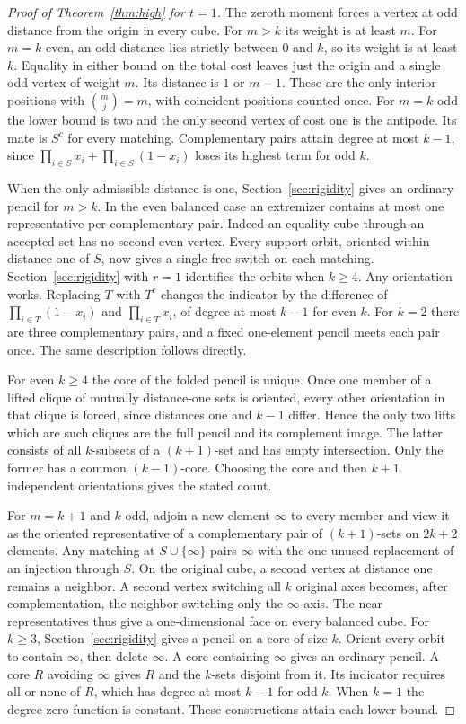\documentclass[11pt,letterpaper]{article}
\numberwithin{equation}{section}
\begin{document}
\begin{proof}[Proof of Theorem~\ref{thm:high} for $t=1$]

The zeroth moment forces a vertex at odd distance from the origin in every cube. For $m>k$ its
weight is at least $m$. For $m=k$ even, an odd distance lies strictly between $0$ and $k$, so
its weight is at least $k$. Equality in either bound on the total cost leaves just the origin
and a single odd vertex of weight $m$. Its distance is $1$ or $m-1$. These are the only
interior positions with $\binom mj=m$, with coincident positions counted once. For $m=k$ odd
the lower bound is two and the only second vertex of cost one is the antipode. Its mate is
$S^c$ for every matching. Complementary pairs attain degree at most $k-1$, since $\prod_{i\in
S}x_i+\prod_{i\in S}(1-x_i)$ loses its highest term for odd $k$.

When the only admissible distance is one, Section~\ref{sec:rigidity} gives an ordinary pencil
for $m>k$. In the even balanced case an extremizer contains at most one representative per
complementary pair. Indeed an equality cube through an accepted set has no second even vertex.
Every support orbit, oriented within distance one of $S$, now gives a single free switch on
each matching. Section~\ref{sec:rigidity} with $r=1$ identifies the orbits when $k\ge4$. Any
orientation works. Replacing $T$ with $T^c$ changes the indicator by the difference of
$\prod_{i\in T}(1-x_i)$ and $\prod_{i\in T}x_i$, of degree at most $k-1$ for even $k$. For
$k=2$ there are three complementary pairs, and a fixed one-element pencil meets each pair
once. The same description follows directly.

For even $k\ge4$ the core of the folded pencil is unique. Once one member of a lifted clique
of mutually distance-one sets is oriented, every other orientation in that clique is forced,
since distances one and $k-1$ differ. Hence the only two lifts which are such cliques are the
full pencil and its complement image. The latter consists of all $k$-subsets of a $(k+1)$-set
and has empty intersection. Only the former has a common $(k-1)$-core. Choosing the core and
then $k+1$ independent orientations gives the stated count.

For $m=k+1$ and $k$ odd, adjoin a new element $\infty$ to every member and view it as the
oriented representative of a complementary pair of $(k+1)$-sets on $2k+2$ elements. Any
matching at $S\cup\{\infty\}$ pairs $\infty$ with the one unused replacement of an injection
through $S$. On the original cube, a second vertex at distance one remains a neighbor. A
second vertex switching all $k$ original axes becomes, after complementation, the neighbor
switching only the $\infty$ axis. The near representatives thus give a one-dimensional face on
every balanced cube. For $k\ge3$, Section~\ref{sec:rigidity} gives a pencil on a core of size
$k$. Orient every orbit to contain $\infty$, then delete $\infty$. A core containing $\infty$
gives an ordinary pencil. A core $R$ avoiding $\infty$ gives $R$ and the $k$-sets disjoint
from it. Its indicator requires all or none of $R$, which has degree at most $k-1$ for odd
$k$. When $k=1$ the degree-zero function is constant. These constructions attain each lower
bound.
\end{proof}
\end{document}
